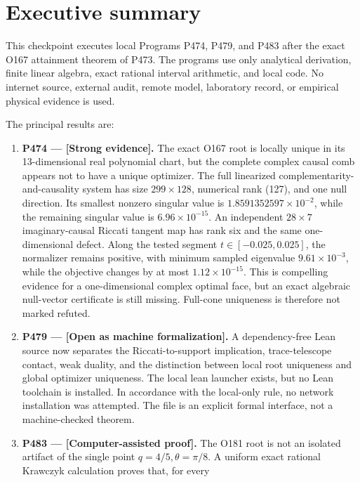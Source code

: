 \documentclass[11pt,a4paper,openany]{report}
\newcommand{\statusStrong}{\textcolor{finblue}{[Strong evidence]}}
\begin{document}
\chapter{Executive summary}

This checkpoint executes local Programs P474, P479, and P483 after the exact O167 attainment theorem of P473. The programs use only analytical derivation, finite linear algebra, exact rational interval arithmetic, and local code. No internet source, external audit, remote model, laboratory record, or empirical physical evidence is used.

The principal results are:

\begin{enumerate}
\item 
\textbf{P474 --- \statusStrong{}.} The exact O167 root is locally unique in its 13-dimensional real polynomial chart, but the complete complex causal comb appears not to have a unique optimizer. The full linearized complementarity-and-causality system has size \(299\times128\), numerical rank (127), and one null direction. Its smallest nonzero singular value is \(1.8591352597\times10^{-2}\), while the remaining singular value is \(6.96\times10^{-15}\). An independent \(28\times7\) imaginary-causal Riccati tangent map has rank six and the same one-dimensional defect. Along the tested segment \(t\in[-0.025,0.025]\), the normalizer remains positive, with minimum sampled eigenvalue \(9.61\times10^{-3}\), while the objective changes by at most \(1.12\times10^{-15}\). This is compelling evidence for a one-dimensional complex optimal face, but an exact algebraic null-vector certificate is still missing. Full-cone uniqueness is therefore not marked refuted.

\item 
\textbf{P479 --- [Open as machine formalization].} A dependency-free Lean source now separates the Riccati-to-support implication, trace-telescope contact, weak duality, and the distinction between local root uniqueness and global optimizer uniqueness. The local lean launcher exists, but no Lean toolchain is installed. In accordance with the local-only rule, no network installation was attempted. The file is an explicit formal interface, not a machine-checked theorem.

\item 
\textbf{P483 --- \textcolor{fingreen}{[Computer-assisted proof]}.} The O181 root is not an isolated artifact of the single point \(q=4/5,\theta=\pi/8\). A uniform exact rational Krawczyk calculation proves that, for every


\end{enumerate}
\end{document}
